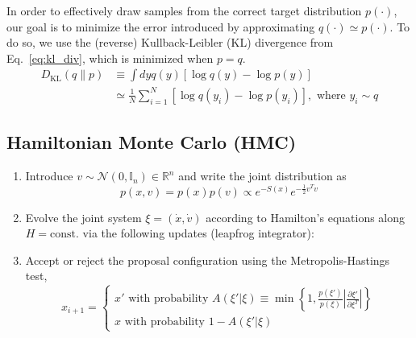 \documentclass[a4paper,11pt]{article}
\begin{document}
In order to effectively draw samples from the correct target distribution
\(p(\cdot)\), our goal is to minimize the error introduced by approximating
\(q(\cdot)\simeq p(\cdot)\).
%
To do so, we use the (reverse) Kullback-Leibler (KL) divergence from
Eq.~\ref{eq:kl_div}, which is minimized when \(p=q\).
\marginpar{\color{red}{[KL-div]}}
%
\begin{align}
    \label{eq:kl_div}
    D_{\mathrm{KL}}(q\|p) 
    &\equiv\int dy q(y)\left[\log q(y) - \log p(y)\right]\\
    &\simeq \frac{1}{N}\sum_{i=1}^{N} \left[\log q(y_{i})-\log p(y_{i})\right],
        \,\,\text{where}\,\, y_{i}\sim q
\end{align}
%
\subsection{\label{subsec:hmc}Hamiltonian Monte Carlo (HMC)}
\begin{enumerate}
    \item Introduce \(v \sim \mathcal{N} (0,\mathbb{I}_{n}) \in \mathbb{R}^{n}\)
        and write the joint distribution as
        \begin{equation}
            p(x, v) = p(x) p(v) \propto e^{-S(x)} e^{-\frac{1}{2} v^{T} v}
        \end{equation}
    \item Evolve the joint system \(\xi=(\dot x, \dot v)\) according to
        Hamilton's equations along \(H=\text{const.}\) via the following updates (leapfrog
        integrator):
    \item Accept or reject the proposal configuration using the
        Metropolis-Hastings test,
        \begin{equation}
            x_{i+1} = \begin{cases}
                x' \text{ with probability } 
                    A(\xi'|\xi) \equiv \min\left\{1, \frac{p(\xi')}{p(\xi)}%
                    \left|\frac{\partial\xi'}{\partial\xi^{T}}\right|\right\}\\
                x \text{ with probability } 1 - A(\xi'|\xi)
            \end{cases}
        \end{equation}
\end{enumerate}
\end{document}
